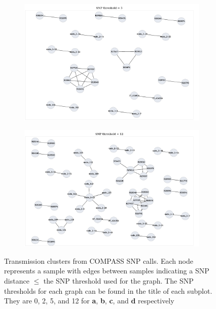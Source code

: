 \begin{figure}
\begin{subfigure}[b]{0.45\textwidth}
         \caption{}
     \end{subfigure}
     \begin{subfigure}[b]{0.45\textwidth}
         \centering
         \includegraphics[width=\textwidth]{Appendix1/Figs/compass_clusters_t5.png}
         \caption{}
     \end{subfigure}
     \hfill
     \begin{subfigure}[b]{0.45\textwidth}
         \centering
         \includegraphics[width=\textwidth]{Appendix1/Figs/compass_clusters_t12.png}
         \caption{}
     \end{subfigure}
        \caption{Transmission clusters from COMPASS SNP calls. Each node represents a sample with edges between samples indicating a SNP distance $\le$ the SNP threshold used for the graph. The SNP thresholds for each graph can be found in the title of each subplot. They are 0, 2, 5, and 12 for \textbf{a}, \textbf{b}, \textbf{c}, and \textbf{d} respectively}
        \label{fig:compass-original-clusters}
\end{figure}

